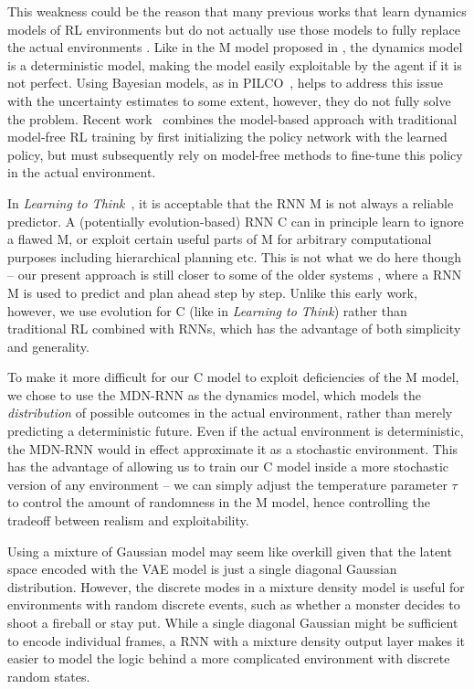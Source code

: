 \documentclass{article}
\begin{document}
This weakness could be the reason that many previous works that learn dynamics models of RL environments but do not actually use those models to fully replace the actual environments \cite{action_conditional_video_prediction,recurrent_env_sim}. Like in the M model proposed in \cite{s05_making_the_world_differentiable,s05a_cm,s05b_rl}, the dynamics model is a deterministic model, making the model easily exploitable by the agent if it is not perfect. Using Bayesian models, as in PILCO~\cite{pilco}, helps to address this issue with the uncertainty estimates to some extent, however, they do not fully solve the problem. Recent work~\cite{Nagabandi2017} combines the model-based approach with traditional model-free RL training by first initializing the policy network with the learned policy, but must subsequently rely on model-free methods to fine-tune this policy in the actual environment.

In \textit{Learning to Think}~\cite{learning_to_think}, it is acceptable that the RNN M is not always a reliable predictor. A (potentially evolution-based) RNN C can in principle learn to ignore a flawed M, or exploit certain useful parts of M for arbitrary computational purposes including hierarchical planning etc. This is not what we do here though -- our present approach is still closer to some of the older systems \cite{s05_making_the_world_differentiable,s05a_cm,s05b_rl}, where a RNN M is used to predict and plan ahead step by step. Unlike this early work, however, we use evolution for C (like in \textit{Learning to Think}) rather than traditional RL combined with RNNs, which has the advantage of both simplicity and generality.

To make it more difficult for our C model to exploit deficiencies of the M model, we chose to use the MDN-RNN as the dynamics model, which models the \textit{distribution} of possible outcomes in the actual environment, rather than merely predicting a deterministic future. Even if the actual environment is deterministic, the MDN-RNN would in effect approximate it as a stochastic environment. This has the advantage of allowing us to train our C model inside a more stochastic version of any environment -- we can simply adjust the temperature parameter $\tau$ to control the amount of randomness in the M model, hence controlling the tradeoff between realism and exploitability.

Using a mixture of Gaussian model may seem like overkill given that the latent space encoded with the VAE model is just a single diagonal Gaussian distribution. However, the discrete modes in a mixture density model is useful for environments with random discrete events, such as whether a monster decides to shoot a fireball or stay put. While a single diagonal Gaussian might be sufficient to encode individual frames, a RNN with a mixture density output layer makes it easier to model the logic behind a more complicated environment with discrete random states.
\end{document}

